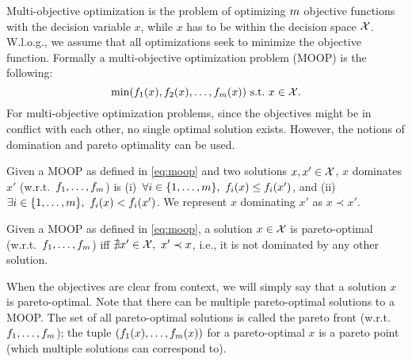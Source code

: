 Multi-objective optimization is the problem of optimizing $m$ objective functions with the decision variable $x$, while $x$ has to be within the decision space $\mathcal{X}$.
W.l.o.g., we assume that all optimizations seek to minimize the objective function.
Formally a multi-objective optimization problem (MOOP) is the following:
\begin{equation}\label{eq:moop}
  \min (\generalobj_1(x),\generalobj_2(x),\dots,\generalobj_\nobj(x))\ \text{s.t.}\ x\in \feasible.
\end{equation}
For multi-objective optimization problems, since the objectives might be in conflict with each other, no single optimal solution exists.
However, the notions of domination and pareto optimality can be used.
\begin{definition}[Domination]
  Given a MOOP as defined in \cref{eq:moop} and two solutions $x,x' \in \mathcal{X}$, $x$ dominates $x'$ (w.r.t.\ $f_1,\dots,f_m$) is (i)~$\forall i\in\{1,\dots,\nobj\},\ \generalobj_i(x) \leq \generalobj_i(x')$, and (ii)~$\exists i\in\{1,\dots,m\},\ f_i(x) < f_i(x')$.
  We represent $x$ dominating $x'$ as $x \prec x'$.
\end{definition}
\begin{definition}
  Given a MOOP as defined in \cref{eq:moop}, a solution $x \in \mathcal{X}$ is pareto-optimal (w.r.t.\ $f_1,\dots,f_m$) iff $\nexists x' \in \mathcal{X},\ x' \prec x$, i.e., it is not dominated by any other solution.
\end{definition}
When the objectives are clear from context, we will simply say that a solution $x$ is pareto-optimal.
Note that there can be multiple pareto-optimal solutions to a MOOP.
The set of all pareto-optimal solutions is called the pareto front (w.r.t.\ $f_1,\dots,f_m$); the tuple $(f_1(x),\dots,f_m(x))$ for a pareto-optimal $x$ is a pareto point (which multiple solutions can correspond to).

